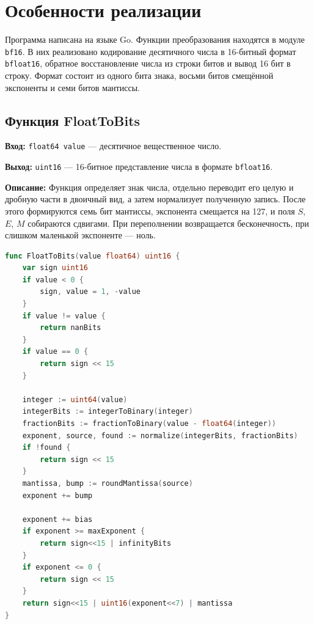 \section{Особенности реализации}

Программа написана на языке Go. Функции преобразования находятся в модуле
\texttt{bf16}. В них реализовано кодирование десятичного
числа в 16-битный формат \texttt{bfloat16}, обратное восстановление числа из
строки битов и вывод 16 бит в строку. Формат состоит из одного бита
знака, восьми битов смещённой экспоненты и семи битов мантиссы.

\vspace{8pt}
\subsection*{Функция FloatToBits}
\textbf{Вход:} \texttt{float64 value} --- десятичное вещественное число. \par
\textbf{Выход:} \texttt{uint16} --- 16-битное представление числа в формате
\texttt{bfloat16}. \par
\textbf{Описание:} Функция определяет знак числа, отдельно переводит его
целую и дробную части в двоичный вид, а затем нормализует полученную запись.
После этого формируются семь бит мантиссы, экспонента смещается на 127, и
поля $S$, $E$, $M$ собираются сдвигами. При переполнении возвращается
бесконечность, при слишком маленькой экспоненте --- ноль. \par
\vspace{6pt}

\begin{lstlisting}[style=common, language=Go, caption=FloatToBits, label=lst:float-to-bits]
func FloatToBits(value float64) uint16 {
    var sign uint16
    if value < 0 {
        sign, value = 1, -value
    }
    if value != value {
        return nanBits
    }
    if value == 0 {
        return sign << 15
    }

    integer := uint64(value)
    integerBits := integerToBinary(integer)
    fractionBits := fractionToBinary(value - float64(integer))
    exponent, source, found := normalize(integerBits, fractionBits)
    if !found {
        return sign << 15
    }
    mantissa, bump := roundMantissa(source)
    exponent += bump

    exponent += bias
    if exponent >= maxExponent {
        return sign<<15 | infinityBits
    }
    if exponent <= 0 {
        return sign << 15
    }
    return sign<<15 | uint16(exponent<<7) | mantissa
}
\end{lstlisting}

